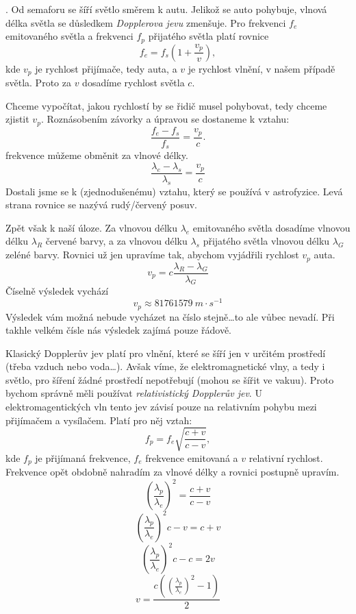 \documentclass{../../../../style/mkimain}
\begin{document}
\noindent{}
.
\klein
Od semaforu se šíří světlo směrem k autu. Jelikož se auto pohybuje, vlnová délka světla se důsledkem \emph{Dopplerova jevu} zmenšuje.
Pro frekvenci $f_e$ emitovaného světla a frekvenci $f_p$ přijatého světla platí rovnice
$$f_e=f_s\left(1+\frac{v_p}{v}\right),$$
kde $v_p$ je rychlost přijímače, tedy auta, a $v$ je rychlost vlnění, v našem případě světla.
Proto za $v$ dosadíme rychlost světla $c$.

Chceme vypočítat, jakou rychlostí by se řidič musel pohybovat, tedy chceme zjistit $v_p$.
Roznásobením závorky a úpravou se dostaneme k vztahu:
$$\frac{f_e-f_s}{f_s}=\frac{v_p}{c}.$$
frekvence můžeme obměnit za vlnové délky. 
$$\frac{\lambda_e-\lambda_s}{\lambda_s}=\frac{v_p}{c}$$
Dostali jsme se k (zjednodušenému) vztahu, který se používá v astrofyzice. Levá strana rovnice se nazývá rudý/červený posuv. 

Zpět však k naší úloze.
Za vlnovou délku $\lambda_e$ emitovaného světla dosadíme vlnovou délku $\lambda_R$ červené barvy, a za vlnovou délku $\lambda_s$ přijatého světla vlnovou délku $\lambda_G$ zeléné barvy. 
Rovnici už jen upravíme tak, abychom vyjádřili rychlost $v_p$ auta.
$${v_p}=c\frac{\lambda_R-\lambda_G}{\lambda_G}$$
Číselně výsledek vychází
$$v_p\approx\qty{81 761 579}{m\cdot s^{-1}}$$
Výsledek vám možná nebude vycházet na číslo stejně\dots to ale vůbec nevadí. Při takhle velkém čísle nás výsledek zajímá pouze řádově.  

Klasický Dopplerův jev platí pro vlnění, které se šíří jen v určitém prostředí (třeba vzduch nebo voda\dots).
Avšak víme, že elektromagnetické vlny, a tedy i světlo, pro šíření žádné prostředí nepotřebují (mohou se šířit ve vakuu).
Proto bychom správně měli používat \textit{relativistický Dopplerův jev}.
U elektromagentických vln tento jev závisí pouze na relativním pohybu mezi přijímačem a vysílačem.
\newpage
\noindent
Platí pro něj vztah:
$$f_p=f_e\sqrt{\frac{c+v}{c-v}},$$
kde $f_p$ je přijímaná frekvence, $f_e$ frekvence emitovaná a $v$ relativní rychlost.
Frekvence opět obdobně nahradím za vlnové délky a rovnici postupně upravím.
$$\left(\frac{\lambda_p}{\lambda_e}\right)^2=\frac{c+v}{c-v}$$
$$\left(\frac{\lambda_p}{\lambda_e}\right)^2{c-v}={c+v}$$
$$\left(\frac{\lambda_p}{\lambda_e}\right)^2c-c=2v$$
$$v=\frac{c\left(\left(\frac{\lambda_p}{\lambda_e}\right)^2-1\right)}{2}$$
\end{document}
